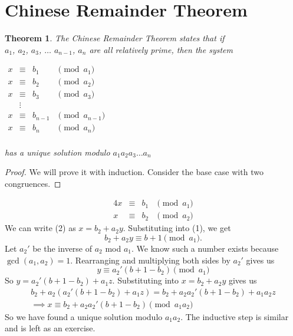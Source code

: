 \documentclass[letterpaper]{article}
\theoremstyle{plain}
\newtheorem{thm}{Theorem}[section]
\theoremstyle{definition}
\theoremstyle{remark}
\begin{document}
\section{Chinese Remainder Theorem}
\begin{mdframed}
    \begin{thm} 
        The Chinese Remainder Theorem states that if \\$a_1$, $a_2$, $a_3$, $\dots$ $a_{n-1}$, $a_n$ are all relatively prime, then the system
    \begin{center}
        $\begin{array}{rcll}
             x &\equiv &b_1 &\pmod{a_1}\\
             x &\equiv &b_2 &\pmod{a_2}\\
             x &\equiv &b_3 &\pmod{a_3}\\
               &\vdots & &\\
            x &\equiv &b_{n-1} &\pmod{a_{n-1}}\\

             x &\equiv &b_n &\pmod{a_n}\\
        \end{array}$
    \end{center}
    has a unique solution modulo $a_1 a_2 a_3 \dots a_n$
\end{thm}

\end{mdframed}
\begin{proof} We will prove it with induction. Consider the base case with two congruences. 
\end{proof}
\begin{alignat}{4}
    x &\equiv &b_1 &\pmod{a_1}\\
    x &\equiv &b_{2} &\pmod{a_{2}}
\end{alignat}
We can write (2) as $x = b_2 + a_2y$. Substituting into (1), we get $$b_2 + a_2y \equiv b+1 \pmod{a_1}.$$
Let $a_2'$ be the inverse of $a_2$ mod $a_1$. We know such a number exists because $\gcd(a_1,a_2)=1$. 
Rearranging and multiplying both sides by $a_2'$ gives us $$y \equiv a_2'(b+1-b_2) \pmod{a_1}$$
So $y = a_2'(b+1-b_2) + a_1z$. Substituting into $x = b_2 + a_2y$ gives us 
\begin{align*}
    b_2 + a_2(a_2'(b+1-b_2)+a_1z)=b_2+a_2a_2'(b+1-b_2)+a_1a_2z\\
    \implies x \equiv b_2+a_2a_2'(b+1-b_2) \pmod{a_1a_2}
\end{align*}
So we have found a unique solution modulo $a_1a_2$. The inductive step is similar and is left as an exercise.
\end{document}
